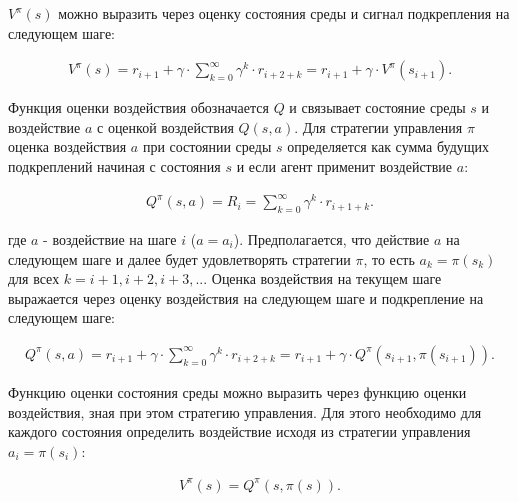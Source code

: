 $ V^\pi(s) $ можно выразить через оценку состояния среды и сигнал подкрепления на следующем шаге:

\begin{equation}
\label{eq:1_2p1}
\begin{alignedat}{2}
V^\pi(s)=r_{i+1} + \gamma\cdot\sum\limits_{k=0}^{\infty}\gamma^k \cdot r_{i+2+k}=r_{i+1} + \gamma \cdot V^\pi(s_{i+1}).
\end{alignedat}
\end{equation}

Функция оценки воздействия обозначается $ Q $ и связывает состояние среды $ s $ и воздействие $ a $ с оценкой воздействия $ Q(s,a) $. Для стратегии управления $ \pi $ оценка воздействия $ a $ при состоянии среды $ s $ определяется как сумма будущих подкреплений начиная с состояния $ s $ и если агент применит воздействие $ a $:

\begin{equation}
\label{eq:1_2p2}
\begin{alignedat}{2}
Q^\pi (s,a) = R_i = \sum\limits_{k=0}^{\infty}\gamma^k \cdot r_{i+1+k}.
\end{alignedat}
\end{equation}

\noindent где $ a $ - воздействие на шаге $ i $ ($ a=a_i $). Предполагается, что действие $ a $ на следующем шаге и далее будет удовлетворять стратегии $ \pi $, то есть $ a_k=\pi(s_k) $ для всех $ k=i+1, i+2, i+3, ... $ Оценка воздействия на текущем шаге выражается через оценку воздействия на следующем шаге и подкрепление на следующем шаге:

\begin{equation}
\label{eq:1_2p3}
\begin{alignedat}{2}
Q^\pi (s,a) = r_{i+1} + \gamma\cdot\sum\limits_{k=0}^{\infty}\gamma^k \cdot r_{i+2+k}=r_{i+1} + \gamma \cdot Q^\pi(s_{i+1}, \pi(s_{i+1})).
\end{alignedat}
\end{equation}

Функцию оценки состояния среды можно выразить через функцию оценки воздействия, зная при этом стратегию управления. Для этого необходимо для каждого состояния определить воздействие исходя из стратегии управления $ a_i = \pi(s_i) $:

\begin{equation}
\label{eq:1_2p4}
\begin{alignedat}{2}
V^\pi(s) = Q^\pi(s, \pi(s)).
\end{alignedat}
\end{equation}

